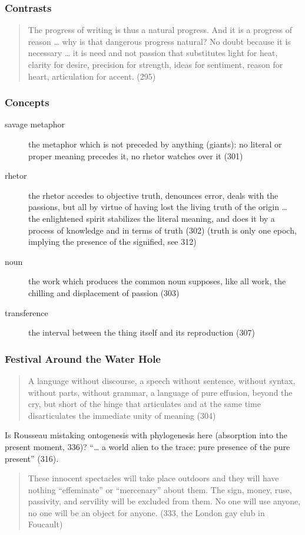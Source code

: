 \documentclass[xcolor=dvipsnames]{beamer}
\begin{document}
\begin{frame}
  \frametitle{Contrasts}
  \begin{quote}
    The progress of writing is thus a natural progress. And it is a
    progress of reason {\ldots} why is that dangerous progress
    natural? No doubt because it is necessary {\ldots} it is need and
    not passion that substitutes light for heat, clarity for desire,
    precision for strength, ideas for sentiment, reason for heart,
    articulation for accent. (295)
  \end{quote}  
\end{frame}

\begin{frame}
  \frametitle{Concepts}
  \begin{description}
  \item[savage metaphor] the metaphor which is not preceded by
    anything (giants): no literal or proper meaning precedes it, no
    rhetor watches over it (301)
    \item[rhetor] the rhetor accedes to objective truth, denounces
      error, deals with the passions, but all by virtue of having lost
      the living truth of the origin {\ldots} the enlightened spirit
      stabilizes the literal meaning, and does it by a process of
      knowledge and in terms of truth (302) (truth is only one epoch,
      implying the presence of the signified, see 312)
    \item[noun] the work which produces the common noun supposes, like
      all work, the chilling and displacement of passion (303)
    \item[transference] the interval between the thing itself and its
      reproduction (307)
  \end{description}
\end{frame}

\begin{frame}
  \frametitle{Festival Around the Water Hole}
  \begin{quote}
    A language without discourse, a speech without sentence, without
    syntax, without parts, without grammar, a language of pure
    effusion, beyond the cry, but short of the hinge that articulates
    and at the same time disarticulates the immediate unity of meaning
    (304)
  \end{quote}
  Is Rousseau mistaking ontogenesis with phylogenesis here (absorption
  into the present moment, 336)? ``{\ldots} a world alien to the
  trace: pure presence of the pure present'' (316).
      \begin{quote}
        These innocent spectacles will take place outdoors and they
        will have nothing ``effeminate'' or ``mercenary'' about them.
        The sign, money, ruse, passivity, and servility will be
        excluded from them. No one will use anyone, no one will be an
        object for anyone. (333, the London gay club in Foucault)
      \end{quote}
\end{frame}
\end{document}
